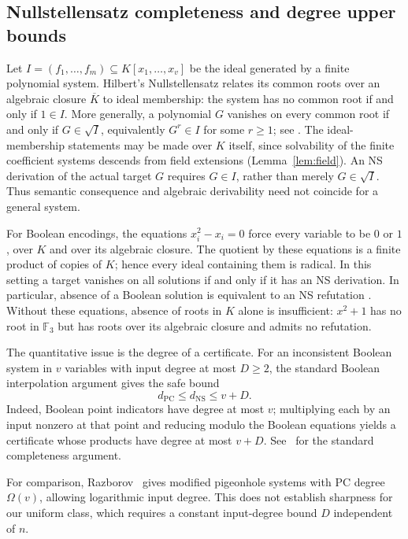 \documentclass[11pt,a4paper]{article}
\theoremstyle{definition}\newtheorem{definition}[theorem]{Definition}
\theoremstyle{remark}\newtheorem{remark}[theorem]{Remark}
\newcommand{\NS}{\mathrm{NS}}\newcommand{\PC}{\mathrm{PC}}
\begin{document}
\subsection{Nullstellensatz completeness and degree upper bounds}\label{sec:booleanrole}
Let $I=(f_1,\ldots,f_m)\subseteq K[x_1,\ldots,x_v]$ be the ideal
generated by a finite polynomial system. Hilbert's Nullstellensatz
relates its common roots over an algebraic closure $\overline K$ to
ideal membership: the system has no common root if and only if
$1\in I$. More generally, a polynomial $G$ vanishes on every common
root if and only if $G\in\sqrt I$, equivalently $G^r\in I$ for some
$r\ge1$; see \cite{LangAlgebra}. The ideal-membership statements may be
made over $K$ itself, since solvability of the finite coefficient
systems descends from field extensions (Lemma~\ref{lem:field}).
An NS derivation of the actual target $G$ requires $G\in I$, rather
than merely $G\in\sqrt I$. Thus semantic consequence and algebraic
derivability need not coincide for a general system.

For Boolean encodings, the equations $x_i^2-x_i=0$ force every variable
to be $0$ or $1$, over $K$ and over its algebraic closure. The quotient
by these equations is a finite product of copies of $K$; hence every
ideal containing them is radical. In this setting a target vanishes
on all solutions if and only if it has an NS derivation. In particular,
absence of a Boolean solution is equivalent to an NS refutation
\cite{NSFoundations}. Without these equations, absence of roots in $K$
alone is insufficient: $x^2+1$ has no root in $\mathbb F_3$ but has
roots over its algebraic closure and admits no refutation.

The quantitative issue is the degree of a certificate. For an
inconsistent Boolean system in $v$ variables with input degree at most
$D\ge2$, the standard Boolean interpolation argument gives the safe bound
\begin{equation}\label{eq:booleancomplete}
                 d_{\PC}\le d_{\NS}\le v+D.
\end{equation}
Indeed, Boolean point indicators have degree at most $v$; multiplying
each by an input nonzero at that point and reducing modulo the Boolean
equations yields a certificate whose products have degree at most
$v+D$. See~\cite{NSFoundations} for the standard completeness argument.

For comparison, Razborov~\cite{RazborovPC} gives modified pigeonhole
systems with PC degree $\Omega(v)$, allowing logarithmic input degree.
This does not establish sharpness for our uniform class, which requires
a constant input-degree bound $D$ independent of $n$.
\end{document}
